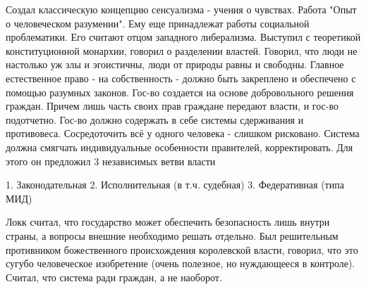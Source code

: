 Создал классическую концепцию сенсуализма - учения о чувствах. Работа "Опыт о человеческом разумении". Ему еще принадлежат работы социальной проблематики. Его считают отцом западного либерализма. Выступил с теоретикой конституционной монархии, говорил о разделении властей. Говорил, что люди не настолько уж злы и эгоистичны, люди от природы равны и свободны. Главное естественное право - на собственность - должно быть  закреплено и обеспечено с помощью разумных законов. Гос-во создается на основе добровольного решения граждан. Причем лишь часть своих прав граждане передают власти, и гос-во подотчетно. Гос-во должно содержать в себе системы сдерживания и противовеса. Сосредоточить всё у одного человека - слишком рисковано. Система должна смягчать индивидуальные особенности правителей, корректировать. Для этого он предложил 3 независимых ветви власти

	1. Законодательная
	2. Исполнительная (в т.ч. судебная)
	3. Федеративная (типа МИД)

Локк считал, что государство может обеспечить безопасность лишь внутри страны, а вопросы внешние необходимо решать отдельно. Был решительным противником божественного происхождения королевской власти, говорил, что это сугубо человеческое изобретение (очень полезное, но нуждающееся в контроле). Считал, что система ради граждан, а не наоборот.
